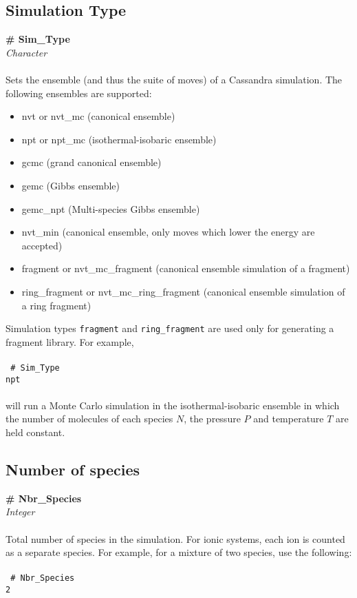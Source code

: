 %
%
%
\subsection{Simulation Type}\label{sec:Sim_Type}

{\bf \# Sim\_Type} \\
{\it Character} \\ \\
%
Sets the ensemble (and thus the suite of moves) of a Cassandra simulation.
The following ensembles are supported: \\
\begin{itemize}
\item nvt or nvt\_mc (canonical ensemble)
\item npt or npt\_mc (isothermal-isobaric ensemble)
\item gcmc (grand canonical ensemble)
\item gemc (Gibbs ensemble)
\item gemc\_npt (Multi-species Gibbs ensemble)
\item nvt\_min (canonical ensemble, only moves which lower the energy are accepted)
\item fragment or nvt\_mc\_fragment (canonical ensemble simulation of a fragment)
\item ring\_fragment or nvt\_mc\_ring\_fragment (canonical ensemble simulation of a ring fragment)
\end{itemize}
Simulation types {\tt fragment} and  {\tt ring\_fragment} are
used only for generating a fragment library.
For example, \\ \\
\texttt{
\# Sim\_Type \\
npt \\ \\
}
%
will run a Monte Carlo simulation in the isothermal-isobaric ensemble in which the number of
molecules of each species $N$, the pressure $P$ and temperature $T$ are held constant.
%
%
%
\subsection{Number of species}\label{sec:Nbr_Species}
{\bf \# Nbr\_Species} \\
{\it Integer} \\ \\
%
Total number of species in the simulation. For ionic systems, each ion
is counted as a separate species. For example, for a mixture of two
species, use the following: \\  \\
%
\texttt{
\# Nbr\_Species \\
2
}
%
%
%
